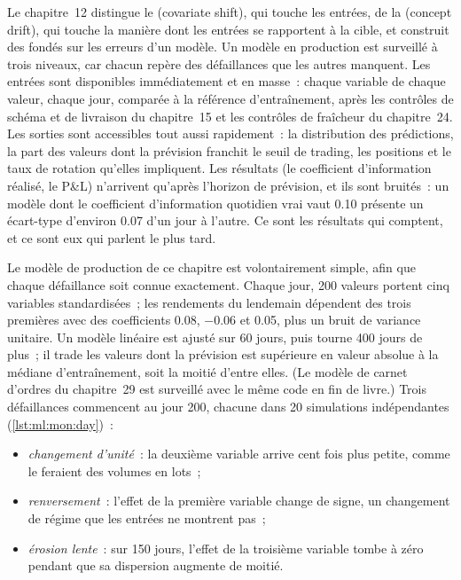 Le chapitre~12 distingue le  (covariate shift), qui touche les entrées, de la  (concept drift), qui touche la manière dont les entrées se rapportent à la
cible, et construit des  fondés sur les erreurs d'un modèle. Un modèle en production est surveillé à trois niveaux, car chacun repère des défaillances
que les autres manquent. Les entrées sont disponibles immédiatement et en masse~: chaque variable de chaque valeur, chaque jour, comparée à la
référence d'entraînement, après les contrôles de schéma et de livraison du chapitre~15 et les contrôles de fraîcheur du chapitre~24. Les sorties sont accessibles
tout aussi rapidement~: la distribution des prédictions, la part des valeurs dont la prévision franchit le seuil de trading, les positions et
le taux de rotation qu'elles impliquent. Les résultats (le coefficient d'information réalisé, le P\&L) n'arrivent qu'après l'horizon de prévision, et ils
sont bruités~: un modèle dont le coefficient d'information quotidien vrai vaut 0.10 présente un écart-type d'environ 0.07 d'un jour à
l'autre. Ce sont les résultats qui comptent, et ce sont eux qui parlent le plus tard.

Le modèle de production de ce chapitre est volontairement simple, afin que chaque défaillance soit connue exactement. Chaque jour, 200 valeurs portent cinq
variables standardisées~; les rendements du lendemain dépendent des trois premières avec des coefficients 0.08, $-0.06$ et 0.05, plus un bruit de
variance unitaire. Un modèle linéaire est ajusté sur 60 jours, puis tourne 400 jours de plus~; il trade les valeurs dont la prévision est supérieure en
valeur absolue à la médiane d'entraînement, soit la moitié d'entre elles. (Le modèle de carnet d'ordres du chapitre~29 est surveillé avec le même code en fin de
livre.) Trois défaillances commencent au jour 200, chacune dans 20 simulations indépendantes (\cref{lst:ml:mon:day})~:
\begin{itemize}
\item \emph{changement d'unité}~: la deuxième variable arrive cent fois plus petite, comme le feraient des volumes en lots~;
\item \emph{renversement}~: l'effet de la première variable change de signe, un changement de régime que les entrées ne montrent pas~;
\item \emph{érosion lente}~: sur 150 jours, l'effet de la troisième variable tombe à zéro pendant que sa dispersion augmente de moitié.
\end{itemize}

